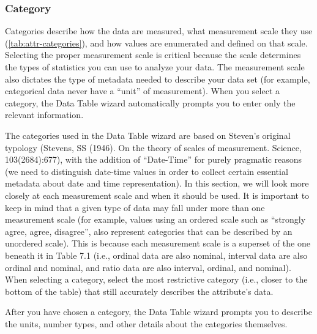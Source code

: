 \subsubsection*{Category}
\label{sec:table-attribute-category}

Categories describe how the data are measured, what measurement scale
they use (\autoref{tab:attr-categories}), and how values are enumerated
and defined on that scale. Selecting the proper measurement scale is
critical because the scale determines the types of statistics you can
use to analyze your data. The measurement scale also dictates the type
of metadata needed to describe your data set (for example, categorical
data never have a ``unit'' of measurement). When you select a category,
the Data Table wizard automatically prompts you to enter only the
relevant information.

The categories used in the Data Table wizard are based on Steven's
original typology (Stevens, SS (1946). On the theory of scales of
measurement. Science, 103(2684):677), with the addition of ``Date-Time''
for purely pragmatic reasons (we need to distinguish date-time values in
order to collect certain essential metadata about date and time
representation). In this section, we will look more closely at each
measurement scale and when it should be used. It is important to keep in
mind that a given type of data may fall under more than one measurement
scale (for example, values using an ordered scale such as ``strongly
agree, agree, disagree'', also represent categories that can be described
by an unordered scale). This is because each measurement scale is a
superset of the one beneath it in Table 7.1 (i.e., ordinal data are also
nominal, interval data are also ordinal and nominal, and ratio data are
also interval, ordinal, and nominal). When selecting a category, select
the most restrictive category (i.e., closer to the bottom of the table)
that still accurately describes the attribute's data.

After you have chosen a category, the Data Table wizard prompts you to
describe the units, number types, and other details about the categories
themselves.  

